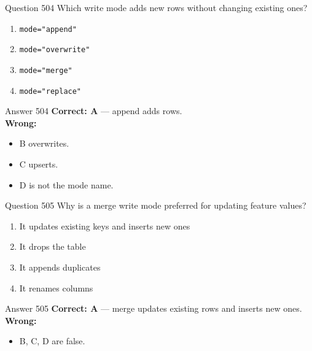 \documentclass[aspectratio=169,11pt]{beamer}
\begin{document}
	\begin{frame}{Question 504}
		Which write mode adds new rows without changing existing ones?
		\begin{enumerate}[label=\Alph*.]
			\item \texttt{mode="append"}
			\item \texttt{mode="overwrite"}
			\item \texttt{mode="merge"}
			\item \texttt{mode="replace"}
		\end{enumerate}
	\end{frame}
	\begin{frame}{Answer 504}
		\textbf{Correct: A} --- append adds rows.\\
		\vspace{0.5em}
		\textbf{Wrong:}
		\begin{itemize}
			\item B overwrites.
			\item C upserts.
			\item D is not the mode name.
		\end{itemize}
	\end{frame}
	
	\begin{frame}{Question 505}
		Why is a merge write mode preferred for updating feature values?
		\begin{enumerate}[label=\Alph*.]
			\item It updates existing keys and inserts new ones
			\item It drops the table
			\item It appends duplicates
			\item It renames columns
		\end{enumerate}
	\end{frame}
	\begin{frame}{Answer 505}
		\textbf{Correct: A} --- merge updates existing rows and inserts new ones.\\
		\vspace{0.5em}
		\textbf{Wrong:}
		\begin{itemize}
			\item B, C, D are false.
		\end{itemize}
	\end{frame}
	
\end{document}

